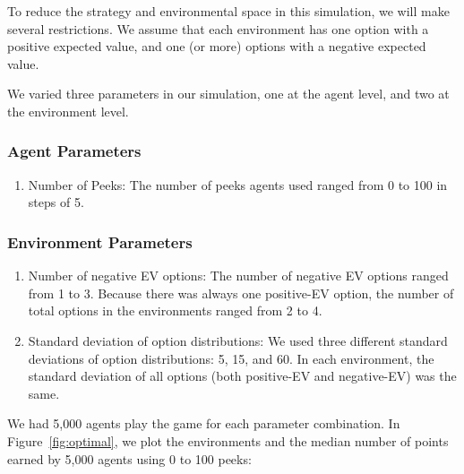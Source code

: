 \documentclass[a4paper,doc,natbib,floatsintext]{apa6}\usepackage[]{graphicx}\usepackage[]{color}
\begin{document}
To reduce the strategy and environmental space in this simulation, we will make several restrictions. We assume that each environment has one option with a positive expected value, and one (or more) options with a negative expected value.

We varied three parameters in our simulation, one at the agent level, and two at the environment level.

\subsubsection{Agent Parameters}

\begin{enumerate}

  \item Number of Peeks: The number of peeks agents used ranged from 0 to 100 in steps of 5.

\end{enumerate}
  
  
\subsubsection{Environment Parameters}

\begin{enumerate}

  \item Number of negative EV options: The number of negative EV options ranged from 1 to 3. Because there was always one positive-EV option, the number of total options in the environments ranged from 2 to 4.
  \item Standard deviation of option distributions: We used three different standard deviations of option distributions: 5, 15, and 60. In each environment, the standard deviation of all options (both positive-EV and negative-EV) was the same.

\end{enumerate}

We had 5,000 agents play the game for each parameter combination. In Figure~\ref{fig:optimal}, we plot the environments and the median number of points earned by 5,000 agents using 0 to 100 peeks:





\end{document}

